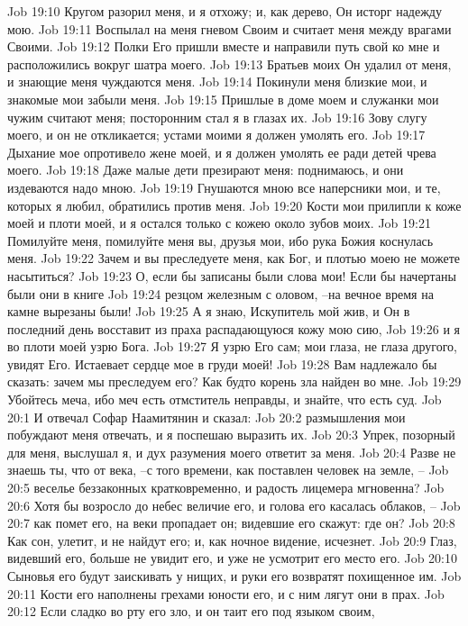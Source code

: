 Job 19:10  Кругом разорил меня, и я отхожу; и, как дерево, Он исторг надежду мою.
Job 19:11  Воспылал на меня гневом Своим и считает меня между врагами Своими.
Job 19:12  Полки Его пришли вместе и направили путь свой ко мне и расположились вокруг шатра моего.
Job 19:13  Братьев моих Он удалил от меня, и знающие меня чуждаются меня.
Job 19:14  Покинули меня близкие мои, и знакомые мои забыли меня.
Job 19:15  Пришлые в доме моем и служанки мои чужим считают меня; посторонним стал я в глазах их.
Job 19:16  Зову слугу моего, и он не откликается; устами моими я должен умолять его.
Job 19:17  Дыхание мое опротивело жене моей, и я должен умолять ее ради детей чрева моего.
Job 19:18  Даже малые дети презирают меня: поднимаюсь, и они издеваются надо мною.
Job 19:19  Гнушаются мною все наперсники мои, и те, которых я любил, обратились против меня.
Job 19:20  Кости мои прилипли к коже моей и плоти моей, и я остался только с кожею около зубов моих.
Job 19:21  Помилуйте меня, помилуйте меня вы, друзья мои, ибо рука Божия коснулась меня.
Job 19:22  Зачем и вы преследуете меня, как Бог, и плотью моею не можете насытиться?
Job 19:23  О, если бы записаны были слова мои! Если бы начертаны были они в книге
Job 19:24  резцом железным с оловом, --на вечное время на камне вырезаны были!
Job 19:25  А я знаю, Искупитель мой жив, и Он в последний день восставит из праха распадающуюся кожу мою сию,
Job 19:26  и я во плоти моей узрю Бога.
Job 19:27  Я узрю Его сам; мои глаза, не глаза другого, увидят Его. Истаевает сердце мое в груди моей!
Job 19:28  Вам надлежало бы сказать: зачем мы преследуем его? Как будто корень зла найден во мне.
Job 19:29  Убойтесь меча, ибо меч есть отмститель неправды, и знайте, что есть суд.
Job 20:1  И отвечал Софар Наамитянин и сказал:
Job 20:2  размышления мои побуждают меня отвечать, и я поспешаю выразить их.
Job 20:3  Упрек, позорный для меня, выслушал я, и дух разумения моего ответит за меня.
Job 20:4  Разве не знаешь ты, что от века, --с того времени, как поставлен человек на земле, --
Job 20:5  веселье беззаконных кратковременно, и радость лицемера мгновенна?
Job 20:6  Хотя бы возросло до небес величие его, и голова его касалась облаков, --
Job 20:7  как помет его, на веки пропадает он; видевшие его скажут: где он?
Job 20:8  Как сон, улетит, и не найдут его; и, как ночное видение, исчезнет.
Job 20:9  Глаз, видевший его, больше не увидит его, и уже не усмотрит его место его.
Job 20:10  Сыновья его будут заискивать у нищих, и руки его возвратят похищенное им.
Job 20:11  Кости его наполнены грехами юности его, и с ним лягут они в прах.
Job 20:12  Если сладко во рту его зло, и он таит его под языком своим,
